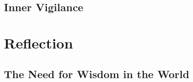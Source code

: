 \documentclass[11pt,twoside,final]{memoir}
\begin{document}
\chapter{Inner Vigilance}


\part{Reflection}

\chapter{The Need for Wisdom in the World}



%
%


\emptysheet

\cleartorecto
\thispagestyle{empty}



\cleartorecto
\thispagestyle{plain}


\emptysheet
\end{document}
